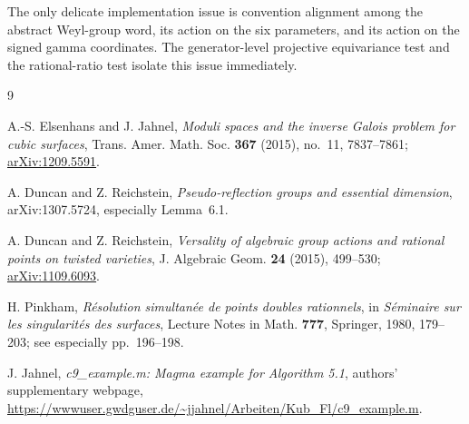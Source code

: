 \documentclass[11pt]{article}
\begin{document}
The only delicate implementation issue is convention alignment among the abstract
Weyl-group word, its action on the six parameters, and its action on the signed
gamma coordinates.  The generator-level projective equivariance test and the
rational-ratio test isolate this issue immediately.

\begin{thebibliography}{9}

A.-S. Elsenhans and J. Jahnel,
\emph{Moduli spaces and the inverse Galois problem for cubic surfaces},
Trans. Amer. Math. Soc. \textbf{367} (2015), no.~11, 7837--7861;
\href{https://arxiv.org/abs/1209.5591}{arXiv:1209.5591}.

A. Duncan and Z. Reichstein,
\emph{Pseudo-reflection groups and essential dimension},
arXiv:1307.5724, especially Lemma~6.1.

A. Duncan and Z. Reichstein,
\emph{Versality of algebraic group actions and rational points on twisted varieties},
J. Algebraic Geom. \textbf{24} (2015), 499--530;
\href{https://arxiv.org/abs/1109.6093}{arXiv:1109.6093}.

H. Pinkham,
\emph{R\'esolution simultan\'ee de points doubles rationnels},
in \emph{S\'eminaire sur les singularit\'es des surfaces},
Lecture Notes in Math. \textbf{777}, Springer, 1980, 179--203;
see especially pp.~196--198.

J. Jahnel,
\emph{c9\_example.m: Magma example for Algorithm 5.1},
authors' supplementary webpage,
\url{https://wwwuser.gwdguser.de/~jjahnel/Arbeiten/Kub_Fl/c9_example.m}.

\end{thebibliography}
\end{document}
